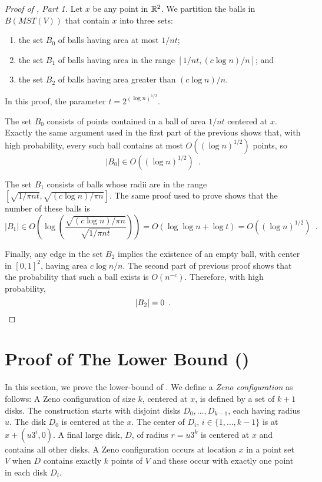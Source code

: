 \documentclass{patmorin}
\newcommand{\mst}{\mathit{MST}}
\begin{document}
\begin{proof}[Proof of , Part 1]
Let $x$ be any point in $\mathbb{R}^2$.  We partition the balls in $B(\mst(V))$
that contain $x$ into three sets:
\begin{enumerate}
  \item the set $B_0$ of balls having area at most $1/nt$;
  \item the set $B_1$ of balls having area in the range $[1/nt,(c\log
  n)/n]$; and
  \item the set $B_2$ of balls having area greater than $(c\log n)/n$.
\end{enumerate}
In this proof, the parameter $t=2^{(\log n)^{1/2}}$.

The set $B_0$ consists of points contained in a ball of area $1/nt$
centered at $x$.  Exactly the same argument used in the first part of
the previous shows that, with high probability, every such ball contains
at most $O((\log n)^{1/2})$ points, so
\[
     |B_0| \in O((\log n)^{1/2}) \enspace .
\]

The set $B_1$ consists of balls whose radii are in the range $[\sqrt{1/\pi
nt},\sqrt{(c\log n)/\pi n}]$.  The same proof used to prove 
shows that the number of these balls is
\[
    |B_1| \in O\left(\log\left(\frac{\sqrt{(c\log n)/\pi n}}{\sqrt{1/\pi nt}}\right)\right) = O(\log\log n + \log t) = O((\log n)^{1/2}) \enspace .
\]

Finally, any edge in the set $B_2$ implies the existence of an empty ball,
with center in $[0,1]^2$, having area $c\log n/n$.  The second part of
previous proof shows that the probability that such a ball exists is
$O(n^{-c})$.  Therefore, with high probability,
\[
   |B_2| = 0 \enspace . \qedhere
\]
\end{proof}

\section{Proof of The Lower Bound ()}

In this section, we prove the lower-bound of .
We define a \emph{Zeno configuration} as follows:  A Zeno configuration
of size $k$, centered at $x$, is defined by a set of $k+1$ disks.
The construction starts with disjoint disks $D_0,\ldots,D_{k-1}$, each
having radius $u$.  The disk $D_0$ is centered at the $x$.  The center of
$D_i$, $i\in\{1,\ldots,k-1\}$ is at $x+(u3^i, 0)$.  A final large disk,
$D$, of radius $r=u3^k$ is centered at $x$ and contains all other disks.
A Zeno configuration occurs at location $x$ in a point set $V$ when $D$
contains exactly $k$ points of $V$ and these occur with exactly one
point in each disk $D_i$.
\end{document}
